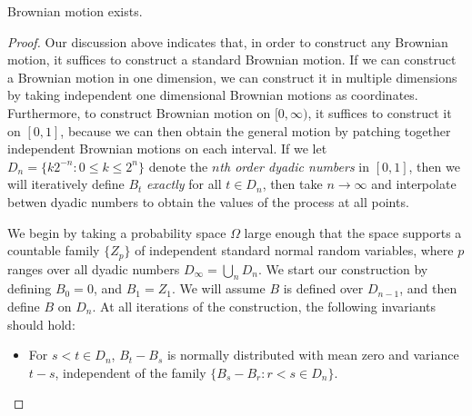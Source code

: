 \begin{theorem}
    Brownian motion exists.
\end{theorem}
\begin{proof}
    Our discussion above indicates that, in order to construct any Brownian motion, it suffices to construct a standard Brownian motion. If we can construct a Brownian motion in one dimension, we can construct it in multiple dimensions by taking independent one dimensional Brownian motions as coordinates. Furthermore, to construct Brownian motion on $[0,\infty)$, it suffices to construct it on $[0,1]$, because we can then obtain the general motion by patching together independent Brownian motions on each interval. If we let $D_n = \{ k2^{-n}: 0 \leq k \leq 2^n \}$ denote the {\it $n$th order dyadic numbers} in $[0,1]$, then we will iteratively define $B_t$ {\it exactly} for all $t \in D_n$, then take $n \to \infty$ and interpolate betwen dyadic numbers to obtain the values of the process at all points.

    We begin by taking a probability space $\Omega$ large enough that the space supports a countable family $\{ Z_p \}$ of independent standard normal random variables, where $p$ ranges over all dyadic numbers $D_\infty = \bigcup_n D_n$. We start our construction by defining $B_0 = 0$, and $B_1 = Z_1$. We will assume $B$ is defined over $D_{n-1}$, and then define $B$ on $D_n$. At all iterations of the construction, the following invariants should hold:
    \begin{itemize}
        \item For $s < t \in D_n$, $B_t - B_s$ is normally distributed with mean zero and variance $t - s$, independent of the family $\{ B_s - B_r: r < s \in D_n \}$.


\end{itemize}
\end{proof}
